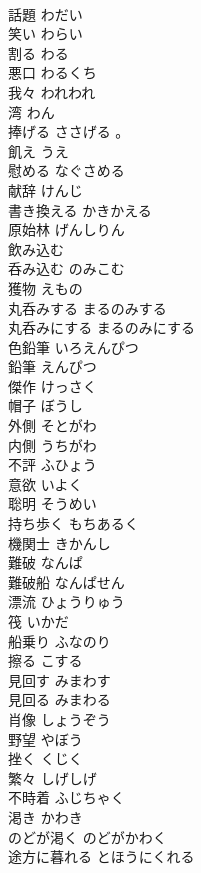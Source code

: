 \documentclass[8pt]{extreport}
\begin{document}
\begin{CJK}{UTF8}{min}
\\	話題	わだい	
\\	笑い	わらい	
\\	割る	わる	
\\	悪口	わるくち	
\\	我々	われわれ	
\\	湾	わん	
\\	捧げる	ささげる	。 
\\	飢え	うえ	
\\	慰める	なぐさめる	
\\	献辞	けんじ	
\\	書き換える	かきかえる	
\\	原始林	げんしりん	
\\	飲み込む 
\\	呑み込む	のみこむ	
\\	獲物	えもの	
\\	丸呑みする	まるのみする	
\\	丸呑みにする	まるのみにする	
\\	色鉛筆	いろえんぴつ	
\\	鉛筆	えんぴつ	
\\	傑作	けっさく	
\\	帽子	ぼうし	
\\	外側	そとがわ	
\\	内側	うちがわ	
\\	不評	ふひょう	
\\	意欲	いよく	
\\	聡明	そうめい	
\\	持ち歩く	もちあるく	
\\	機関士	きかんし	
\\	難破	なんぱ	
\\	難破船	なんぱせん	
\\	漂流	ひょうりゅう	
\\	筏	いかだ	
\\	船乗り	ふなのり	
\\	擦る	こする	
\\	見回す	みまわす	
\\	見回る	みまわる	
\\	肖像	しょうぞう	
\\	野望	やぼう	
\\	挫く	くじく	
\\	繁々	しげしげ	
\\	不時着	ふじちゃく	
\\	渇き	かわき	
\\	のどが渇く	のどがかわく	
\\	途方に暮れる	とほうにくれる	

\end{CJK}
\end{document}
